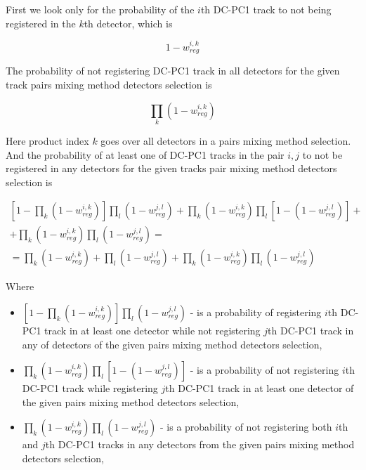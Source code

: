 First we look only for the probability of the $i$th DC-PC1 track to not being registered in the $k$th detector, which is 

\begin{equation}
	1 - w_{reg}^{i, k}
	\label{eq:not_reg_prob}
\end{equation}

 The probability of not registering DC-PC1 track in all detectors for the given track pairs mixing method detectors selection is

\begin{equation}
	\prod_{k} \left( 1 - w_{reg}^{i, k} \right)
\end{equation}

Here product index $k$ goes over all detectors in a pairs mixing method selection. 
And the probability of at least one of DC-PC1 tracks in the pair $i,j$ to not be registered in any detectors for the given tracks pair mixing method detectors selection is

\begin{multline}
	\left[1 - \prod_{k} \left( 1 - w_{reg}^{i, k} \right)\right] \prod_{l} \left( 1 - w_{reg}^{j, l} \right) +
	\prod_{k} \left( 1 - w_{reg}^{i, k} \right) \prod_{l} \left[1 - \left( 1 - w_{reg}^{j, l} \right) \right] + 
	\\ + \prod_{k} \left( 1 - w_{reg}^{i, k} \right) \prod_{l} \left( 1 - w_{reg}^{j, l} \right) = \\
	= \prod_{k} \left( 1 - w_{reg}^{i, k} \right) + \prod_{l} \left( 1 - w_{reg}^{j, l} \right) +
	\prod_{k} \left( 1 - w_{reg}^{i, k} \right) \prod_{l} \left( 1 - w_{reg}^{j, l} \right)
	\label{eq:pair_prob_begin}
\end{multline}

Where 
\begin{itemize}
	\item $\left[1 - \prod_{k} \left( 1 - w_{reg}^{i, k} \right)\right] \prod_{l} \left( 1 - w_{reg}^{j, l} \right)$ - is a probability of registering $i$th DC-PC1 track in at least one detector while not registering $j$th DC-PC1 track in any of detectors of the given pairs mixing method detectors selection,
	\item $\prod_{k} \left( 1 - w_{reg}^{i, k} \right) \prod_{l} \left[1 - \left( 1 - w_{reg}^{j, l} \right) \right]$ - is a probability of not registering $i$th DC-PC1 track while registering $j$th DC-PC1 track in at least one detector of the given pairs mixing method detectors selection,
	\item $\prod_{k} \left( 1 - w_{reg}^{i, k} \right) \prod_{l} \left( 1 - w_{reg}^{j, l} \right)$ - is a probability of not registering both $i$th and $j$th DC-PC1 tracks in any detectors from the given pairs mixing method detectors selection,
\end{itemize}

